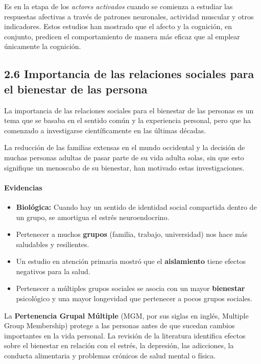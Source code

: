 \documentclass[
]{website}
\begin{document}
Es en la etapa de los \emph{actores activados} cuando se comienza a estudiar las respuestas afectivas a través de patrones neuronales, actividad muscular y otros indicadores. Estos estudios han mostrado que el afecto y la cognición, en conjunto, predicen el comportamiento de manera más eficaz que al emplear únicamente la cognición.

\subsection*{2.6 Importancia de las relaciones sociales para el bienestar de las persona}\label{subtema2_6}

La importancia de las relaciones sociales para el bienestar de las personas es un tema que se basaba en el sentido común y la experiencia personal, pero que ha comenzado a investigarse científicamente en las últimas décadas.

La reducción de las familias extensas en el mundo occidental y la decisión de muchas personas adultas de pasar parte de su vida adulta solas, sin que esto signifique un menoscabo de su bienestar, han motivado estas investigaciones.

\paragraph*{Evidencias}\label{evidencias}

\begin{itemize}
\item
  \textbf{Biológica:} Cuando hay un sentido de identidad social compartida dentro de un grupo, se amortigua el estrés neuroendocrino.
\item
  Pertenecer a muchos \textbf{grupos} (familia, trabajo, universidad) nos hace más saludables y resilientes.
\item
  Un estudio en atención primaria mostró que el \textbf{aislamiento} tiene efectos negativos para la salud.
\item
  Pertenecer a múltiples grupos sociales se asocia con un mayor \textbf{bienestar} psicológico y una mayor longevidad que pertenecer a pocos grupos sociales.
\end{itemize}

La \textbf{Pertenencia Grupal Múltiple} (MGM, por sus siglas en inglés, Multiple Group Membership) protege a las personas antes de que sucedan cambios importantes en la vida personal. La revisión de la literatura identifica efectos sobre el bienestar en relación con el estrés, la depresión, las adicciones, la conducta alimentaria y problemas crónicos de salud mental o física.
\end{document}
